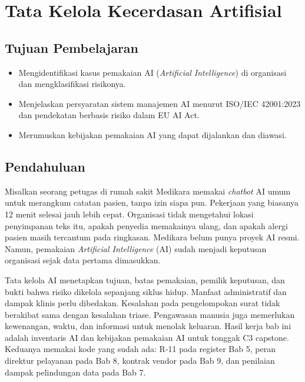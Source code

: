 \chapter{Tata Kelola Kecerdasan Artifisial}

\section*{Tujuan Pembelajaran}
\begin{itemize}
  \item Mengidentifikasi kasus pemakaian AI (\textit{Artificial Intelligence}) di organisasi dan
  mengklasifikasi risikonya.
  \item Menjelaskan persyaratan sistem manajemen AI menurut ISO/IEC 42001:2023 dan pendekatan
  berbasis risiko dalam EU AI Act.
  \item Merumuskan kebijakan pemakaian AI yang dapat dijalankan dan diawasi.
\end{itemize}

\section{Pendahuluan}

Misalkan seorang petugas di rumah sakit Medikara memakai \textit{chatbot} AI umum untuk merangkum
catatan pasien, tanpa izin siapa pun. Pekerjaan yang biasanya 12 menit selesai jauh lebih cepat.
Organisasi tidak mengetahui lokasi penyimpanan teks itu, apakah penyedia memakainya ulang, dan
apakah alergi pasien masih tercantum pada ringkasan. Medikara belum punya proyek AI resmi. Namun,
pemakaian \textit{Artificial Intelligence} (AI) sudah menjadi keputusan organisasi sejak data
pertama dimasukkan.

Tata kelola AI menetapkan tujuan, batas pemakaian, pemilik keputusan, dan bukti bahwa risiko
dikelola sepanjang siklus hidup. Manfaat administratif dan dampak klinis perlu dibedakan.
Kesalahan pada pengelompokan surat tidak berakibat sama dengan kesalahan triase. Pengawasan
manusia juga memerlukan kewenangan, waktu, dan informasi untuk menolak keluaran. Hasil kerja bab
ini adalah inventaris AI dan kebijakan pemakaian AI untuk tonggak C3 capstone. Keduanya memakai
kode yang sudah ada: R-11 pada register Bab 5, peran direktur pelayanan pada Bab 8, kontrak vendor
pada Bab 9, dan penilaian dampak pelindungan data pada Bab 7.

